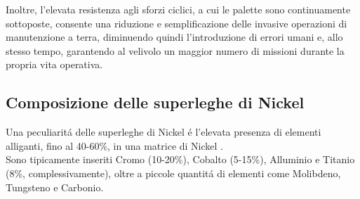 \documentclass{article}
\begin{document}
    Inoltre, l'elevata resistenza agli sforzi ciclici, a cui le palette sono 
    continuamente sottoposte, consente una riduzione e semplificazione delle invasive operazioni
    di manutenzione a terra, diminuendo quindi l'introduzione di errori umani e, allo stesso
    tempo, garantendo al velivolo un maggior numero di missioni durante la propria vita operativa.






    \clearpage

        \subsection{Composizione delle superleghe di Nickel\label{Nickel_composizione}}

        Una peculiaritá delle superleghe di Nickel é l'elevata presenza di elementi alliganti, fino 
        al 40-60\%, in una matrice di Nickel \autocite{Mouritz}. \\ 

        Sono tipicamente inseriti Cromo (10-20\%),
        Cobalto (5-15\%), Alluminio e Titanio (8\%, complessivamente), oltre
        a piccole quantitá di elementi
        come Molibdeno, Tungsteno e Carbonio. \\ \\ 

      
        \begin{table}[h!]
            \centering
            \caption{Funzione degli elementi alliganti \autocite{Mouritz}}
            \label{tab:funz_alliganti}
            \end{table}
        
\end{document}
